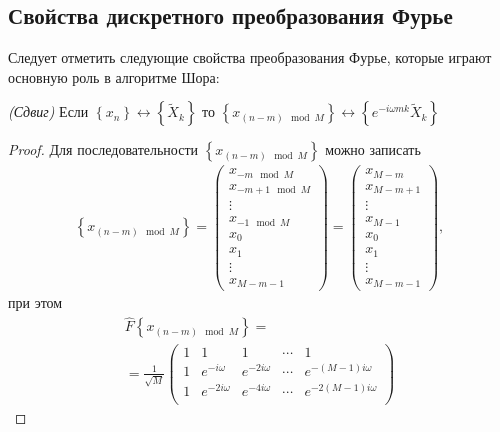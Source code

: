 \subsection{Свойства дискретного преобразования Фурье}
Следует отметить следующие свойства преобразования Фурье, которые
играют основную роль в алгоритме Шора:

\begin{lemma}
\emph{(Сдвиг)}
\label{lemmaAddFourierDiscretFourierShiftTime}
Если $\left\{x_n\right\} \longleftrightarrow \left\{\tilde{X}_k\right\}$ то
$\left\{x_{\left(n - m\right) \mod M}\right\} \longleftrightarrow
\left\{e^{-i \omega m k}\tilde{X}_k\right\}$ 
\end{lemma}

\begin{proof}
Для последовательности $\left\{x_{\left(n - m\right) \mod M}\right\}$
можно записать
\begin{eqnarray}
\left\{x_{\left(n - m\right) \mod M}\right\} = 
\begin{pmatrix}
x_{-m \mod M} \\
x_{-m+1 \mod M}\\ 
\vdots \\
x_{-1 \mod M}\\
x_0 \\
x_1 \\
\vdots \\
x_{M - m - 1}
\end{pmatrix} = 
\begin{pmatrix}
x_{M - m} \\
x_{M - m + 1}\\ 
\vdots \\
x_{M - 1}\\
x_0 \\
x_1 \\
\vdots \\
x_{M - m - 1}
\end{pmatrix},
\nonumber
\end{eqnarray}
при этом
\begin{eqnarray}
\hat{F}\left\{x_{\left(n - m\right) \mod M}\right\} = 
\nonumber \\
= \frac{1}{\sqrt{M}}
\begin{pmatrix}
1 & 1 & 1 & \cdots & 1 \\
1 & e^{-i \omega} & e^{-2 i \omega} & \cdots & 
e^{-\left( M - 1 \right) i \omega} \\
1 & e^{-2 i \omega} & e^{-4 i \omega} & \cdots & 
e^{-2 \left( M - 1 \right) i \omega} \\

\end{pmatrix}
\end{eqnarray}
\end{proof}

